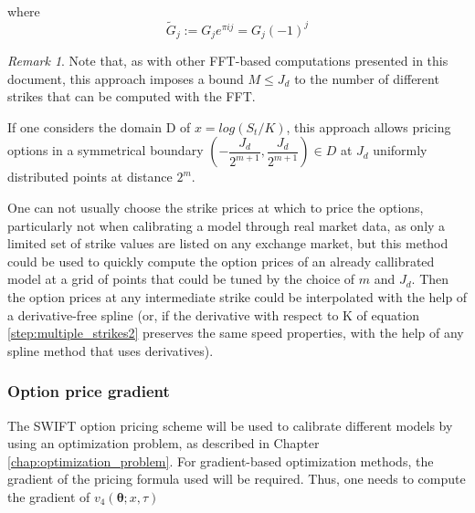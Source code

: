 \documentclass[12,twoside]{mammeTFM}
\theoremstyle{definition}
\theoremstyle{remark}
\newtheorem{remark}[thm]{Remark}
\begin{document}
\begin{itemize}
\begin{equation}
\begin{aligned}
\end{aligned}
\end{equation}
where 
\begin{equation}
\tilde{G}_j := G_j e^{\pi i j} = G_j (-1)^j
\end{equation}
\begin{remark}
Note that, as with other FFT-based computations presented in this document, this approach imposes a bound $M \leq J_d$ to the number of different strikes that can be computed with the FFT.
\end{remark}
If one considers the domain D of $x = log(S_t/K)$, this approach allows pricing options in a symmetrical boundary $(-\dfrac{J_d}{2^{m+1}},\dfrac{J_d}{2^{m+1}}) \in D$ at $J_d$ uniformly distributed points at distance $2^m$.

One can not usually choose the strike prices at which to price the options, particularly not when calibrating a model through real market data, as only a limited set of strike values are listed on any exchange market, but this method could be used to quickly compute the option prices of an already callibrated model at a grid of points that could be tuned by the choice of $m$ and $J_d$. Then the option prices at any intermediate strike could be interpolated with the help of a derivative-free spline (or, if the derivative with respect to K of equation \ref{step:multiple_strikes2} preserves the same speed properties, with the help of any spline method that uses derivatives).
\end{itemize}

\subsubsection{Option price gradient}\label{subsec:gradient}

The SWIFT option pricing scheme will be used to calibrate different models by using an optimization problem, as described in Chapter \ref{chap:optimization_problem}. For gradient-based optimization methods, the gradient of the pricing formula used will be required. Thus, one needs to compute the gradient of $v_4(\boldsymbol{\theta}; x, \tau)$
\end{document}

